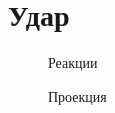 \section{Удар}

\begin{figure}[h]
        \centering
        \caption{Реакции}
        \label{fig:react}
    \endminipage
        \centering
        \caption{Проекция}
        \label{fig:project}
    \endminipage
\end{figure}
